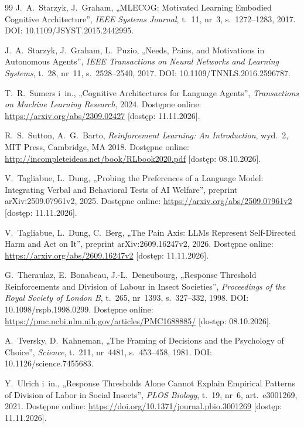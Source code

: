 \begin{thebibliography}{99}
 J.~A.~Starzyk, J.~Graham, „{MLECOG}: Motivated Learning Embodied Cognitive Architecture”, \textit{IEEE Systems Journal}, t.~11, nr~3, s.~1272--1283, 2017. DOI: 10.1109/JSYST.2015.2442995.

 J.~A.~Starzyk, J.~Graham, L.~Puzio, „Needs, Pains, and Motivations in Autonomous Agents”, \textit{IEEE Transactions on Neural Networks and Learning Systems}, t.~28, nr~11, s.~2528--2540, 2017. DOI: 10.1109/TNNLS.2016.2596787.

 T.~R.~Sumers i~in., „Cognitive Architectures for Language Agents”, \textit{Transactions on Machine Learning Research}, 2024. Dostępne online: \url{https://arxiv.org/abs/2309.02427} [dostęp: 11.11.2026].

 R.~S.~Sutton, A.~G.~Barto, \textit{Reinforcement Learning: An Introduction}, wyd.~2, MIT Press, Cambridge, MA 2018. Dostępne online: \url{http://incompleteideas.net/book/RLbook2020.pdf} [dostęp: 08.10.2026].

 V.~Tagliabue, L.~Dung, „Probing the Preferences of a Language Model: Integrating Verbal and Behavioral Tests of {AI} Welfare”, preprint arXiv:2509.07961v2, 2025. Dostępne online: \url{https://arxiv.org/abs/2509.07961v2} [dostęp: 11.11.2026].

 V.~Tagliabue, L.~Dung, C.~Berg, „The Pain Axis: {LLMs} Represent Self-Directed Harm and Act on It”, preprint arXiv:2609.16247v2, 2026. Dostępne online: \url{https://arxiv.org/abs/2609.16247v2} [dostęp: 11.11.2026].

 G.~Theraulaz, E.~Bonabeau, J.-L.~Deneubourg, „Response Threshold Reinforcements and Division of Labour in Insect Societies”, \textit{Proceedings of the Royal Society of London B}, t.~265, nr~1393, s.~327--332, 1998. DOI: 10.1098/rspb.1998.0299. Dostępne online: \url{https://pmc.ncbi.nlm.nih.gov/articles/PMC1688885/} [dostęp: 08.10.2026].

 A.~Tversky, D.~Kahneman, „The Framing of Decisions and the Psychology of Choice”, \textit{Science}, t.~211, nr~4481, s.~453--458, 1981. DOI: 10.1126/science.7455683.

 Y.~Ulrich i~in., „Response Thresholds Alone Cannot Explain Empirical Patterns of Division of Labor in Social Insects”, \textit{PLOS Biology}, t.~19, nr~6, art.~e3001269, 2021. Dostępne online: \url{https://doi.org/10.1371/journal.pbio.3001269} [dostęp: 11.11.2026].


\end{thebibliography}
